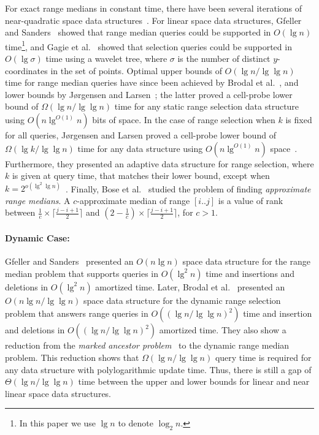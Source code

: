 \documentclass{llncs}
\begin{document}
For exact range medians in constant time, there have been several
iterations of near-quadratic space data
structures~\cite{KMS05,P08,PG09}. For linear space data structures,
Gfeller and Sanders~\cite{GS09} showed that range median queries could
be supported in $O(\lg n)$ time\footnote{In this paper we use $\lg n$
  to denote $\log_2 n$.}, and Gagie et al.~\cite{GPT09} showed that
selection queries could be supported in $O(\lg \sigma)$ time using a
wavelet tree, where $\sigma$ is the number of distinct $y$-coordinates
in the set of points.  Optimal upper bounds of $O(\lg n / \lg \lg n)$
time for range median queries have since been achieved by Brodal et
al.~\cite{BJ09,BGJS10}, and lower bounds by J{\o}rgensen and
Larsen~\cite{JL11}; the latter proved a cell-probe lower bound of
$\Omega(\lg n/ \lg \lg n)$ time for any static range selection data
structure using $O(n \lg^{O(1)} n)$ bits of space.  In the case of
range selection when $k$ is fixed for all queries, J{\o}rgensen and
Larsen proved a cell-probe lower bound of $\Omega(\lg k / \lg \lg n)$
time for any data structure using $O(n \lg^{O(1)}n)$
space~\cite{JL11}.  Furthermore, they presented an adaptive data
structure for range selection, where $k$ is given at query time, that
matches their lower bound, except when $k=2^{o(\lg^2\lg
  n)}$~\cite{JL11}.  Finally, Bose et al.~\cite{BKMT05} studied the
problem of finding \emph{approximate range medians}.  A
$c$-approximate median of range $[i..j]$ is a value of rank between
$\frac{1}{c} \times \lceil \frac{j - i + 1}{2} \rceil$ and $(2 -
\frac{1}{c}) \times \lceil \frac{j - i + 1}{2} \rceil$, for $c > 1$.

\paragraph{Dynamic Case:}

Gfeller and Sanders~\cite{GS09} presented an $O(n \lg n)$ space data
structure for the range median problem that supports queries in
$O(\lg^2 n)$ time and insertions and deletions in $O(\lg^2n)$
amortized time. Later, Brodal et al.~\cite{BJ09,BGJS10} presented an
$O(n\lg n / \lg \lg n)$ space data structure for the dynamic range
selection problem that answers range queries in $O((\lg n/\lg \lg
n)^2)$ time and insertion and deletions in $O((\lg n/\lg \lg n)^2)$
amortized time.  They also show a reduction from the \emph{marked
  ancestor problem}~\cite{AHR98} to the dynamic range median problem.
This reduction shows that $\Omega(\lg n/\lg \lg n)$ query time is
required for any data structure with polylogarithmic update time.
Thus, there is still a gap of $\Theta(\lg n / \lg \lg n)$ time between
the upper and lower bounds for linear and near linear space data
structures. 
\end{document}
